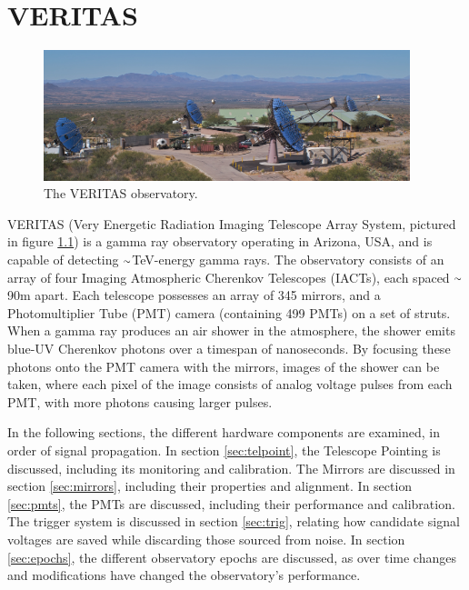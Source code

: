 \cleartooddpage[\thispagestyle{empty}]
\chapter{VERITAS}\label{chapter:veritas}

\begin{figure}[ht]
  \centering
  \includegraphics[width=0.95\textwidth]{images/veritas_array_v6}
  \caption[VERITAS Array]{
    The VERITAS observatory.}
  \label{fig:veritasarray}
\end{figure}

VERITAS (Very Energetic Radiation Imaging Telescope Array System, pictured in figure \ref{fig:veritasarray}) is a gamma ray observatory operating in Arizona, USA, and is capable of detecting $\nicetilde$TeV-energy gamma rays.
The observatory consists of an array of four Imaging Atmospheric Cherenkov Telescopes (IACTs), each spaced $\nicetilde$90m apart.
Each telescope possesses an array of 345 mirrors, and a Photomultiplier Tube (PMT) camera (containing 499 PMTs) on a set of struts.
When a gamma ray produces an air shower in the atmosphere, the shower emits blue-UV Cherenkov photons over a timespan of nanoseconds.
By focusing these photons onto the PMT camera with the mirrors, images of the shower can be taken, where each pixel of the image consists of analog voltage pulses from each PMT, with more photons causing larger pulses.


In the following sections, the different hardware components are examined, in order of signal propagation.
In section \ref{sec:telpoint}, the Telescope Pointing is discussed, including its monitoring and calibration.
The Mirrors are discussed in section \ref{sec:mirrors}, including their properties and alignment.
In section \ref{sec:pmts}, the PMTs are discussed, including their performance and calibration.
The trigger system is discussed in section \ref{sec:trig}, relating how candidate signal voltages are saved while discarding those sourced from noise.
In section \ref{sec:epochs}, the different observatory epochs are discussed, as over time changes and modifications have changed the observatory's performance.


